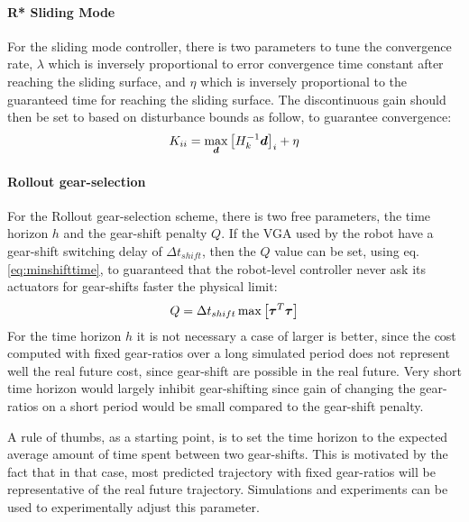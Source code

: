 \paragraph{R* Sliding Mode} For the sliding mode controller, there is two parameters to tune the convergence rate, $\lambda$ which is inversely proportional to error convergence time constant after reaching the sliding surface, and $\eta$ which is inversely proportional to the guaranteed time for reaching the sliding surface. The discontinuous gain should then be set to based on disturbance bounds as follow, to guarantee convergence:
%
\begin{align}
K_{ii} = \operatornamewithlimits{max}\limits_{\vec{d}} \left[ H_k^{-1} \vec{d} \right]_i + \eta
\end{align}
%

\paragraph{Rollout gear-selection}
%
For the Rollout gear-selection scheme, there is two free parameters, the time horizon $h$ and the gear-shift penalty $Q$. If the VGA used by the robot have a gear-shift switching delay of $\Delta t_{shift}$, then the $Q$ value can be set, using eq. \eqref{eq:minshifttime}, to guaranteed that the robot-level controller never ask its actuators for gear-shifts faster the physical limit:
%
\begin{align}
Q = \Delta t_{shift} \operatornamewithlimits{max} \left[ \vec{\tau}^T \vec{\tau} \right]
\end{align}
%
For the time horizon $h$ it is not necessary a case of larger is better, since the cost computed with fixed gear-ratios over a long simulated period does not represent well the real future cost, since gear-shift are possible in the real future. Very short time horizon would largely inhibit gear-shifting since gain of changing the gear-ratios on a short period would be small compared to the gear-shift penalty. 

A rule of thumbs, as a starting point, is to set the time horizon to the expected average amount of time spent between two gear-shifts. This is motivated by the fact that in that case, most predicted trajectory with fixed gear-ratios will be representative of the real future trajectory. Simulations and experiments can be used to experimentally adjust this parameter.



\newpage
